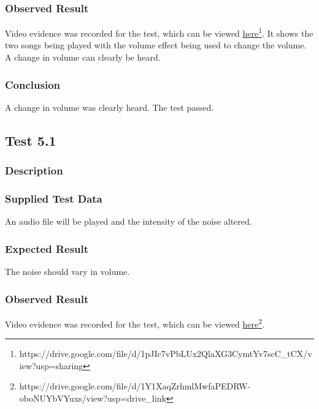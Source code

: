 \subsubsection*{Observed Result}
\label{sec:evidence4.3}
Video evidence was recorded for the test, which can be viewed \href{https://drive.google.com/file/d/1pJIc7vPbLUx2QlaXG3CymtYv7scC_tCX/view?usp=sharing}{here}\footnote{
	https://drive.google.com/file/d/1pJIc7vPbLUx2QlaXG3CymtYv7scC\_tCX/view?usp=sharing
}. It shows the two songs being played with the volume effect being used to change the volume. A change in volume can clearly be heard.

\subsubsection*{Conclusion}
A change in volume was clearly heard. The test passed.


\pagebreak
\subsection{Test 5.1}
\subsubsection*{Description}
\paragraph{}
{
	\centering
}

\subsubsection*{Supplied Test Data}
An audio file will be played and the intensity of the noise altered.

\subsubsection*{Expected Result}
The noise should vary in volume.

\subsubsection*{Observed Result}
\label{sec:evidence5.1}
Video evidence was recorded for the test, which can be viewed \href{https://drive.google.com/file/d/1Y1XaqZrhmlMwfaPEDRW-oboNUYbVYuxs/view?usp=drive_link}{here}\footnote{
	https://drive.google.com/file/d/1Y1XaqZrhmlMwfaPEDRW-oboNUYbVYuxs/view?usp=drive\_link
}.

